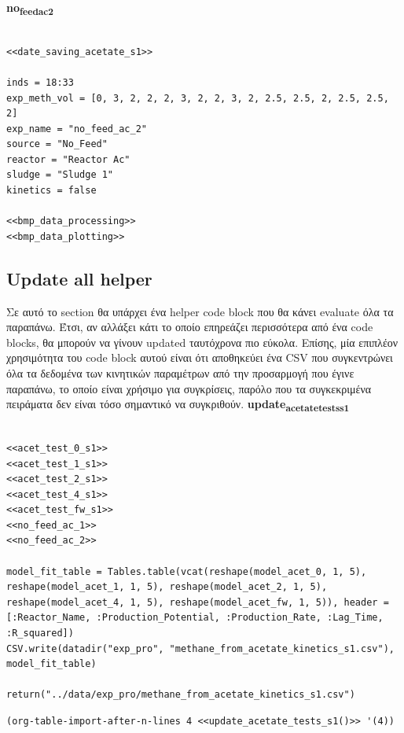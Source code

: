 \documentclass[11pt]{article}
\begin{document}
\textbf{no\textsubscript{feed}\textsubscript{ac}\textsubscript{2}}
\begin{verbatim}

<<date_saving_acetate_s1>>

inds = 18:33
exp_meth_vol = [0, 3, 2, 2, 2, 3, 2, 2, 3, 2, 2.5, 2.5, 2, 2.5, 2.5, 2]
exp_name = "no_feed_ac_2"
source = "No_Feed"
reactor = "Reactor Ac"
sludge = "Sludge 1"
kinetics = false

<<bmp_data_processing>>
<<bmp_data_plotting>>
\end{verbatim}

\subsection{Update all helper}
\label{sec:org0520d5d}
Σε αυτό το section θα υπάρχει ένα helper code block που θα κάνει evaluate όλα τα παραπάνω. Έτσι, αν αλλάξει κάτι το οποίο επηρεάζει περισσότερα από ένα code blocks, θα μπορούν να γίνουν updated ταυτόχρονα πιο εύκολα. Επίσης, μία επιπλέον χρησιμότητα του code block αυτού είναι ότι αποθηκεύει ένα CSV που συγκεντρώνει όλα τα δεδομένα των κινητικών παραμέτρων από την προσαρμογή που έγινε παραπάνω, το οποίο είναι χρήσιμο για συγκρίσεις, παρόλο που τα συγκεκριμένα πειράματα δεν είναι τόσο σημαντικό να συγκριθούν.
\textbf{update\textsubscript{acetate}\textsubscript{tests}\textsubscript{s1}}
\begin{verbatim}

<<acet_test_0_s1>>
<<acet_test_1_s1>>
<<acet_test_2_s1>>
<<acet_test_4_s1>>
<<acet_test_fw_s1>>
<<no_feed_ac_1>>
<<no_feed_ac_2>>

model_fit_table = Tables.table(vcat(reshape(model_acet_0, 1, 5), reshape(model_acet_1, 1, 5), reshape(model_acet_2, 1, 5), reshape(model_acet_4, 1, 5), reshape(model_acet_fw, 1, 5)), header = [:Reactor_Name, :Production_Potential, :Production_Rate, :Lag_Time, :R_squared])
CSV.write(datadir("exp_pro", "methane_from_acetate_kinetics_s1.csv"), model_fit_table)

return("../data/exp_pro/methane_from_acetate_kinetics_s1.csv")
\end{verbatim}

\begin{verbatim}
(org-table-import-after-n-lines 4 <<update_acetate_tests_s1()>> '(4))
\end{verbatim}
\end{document}
